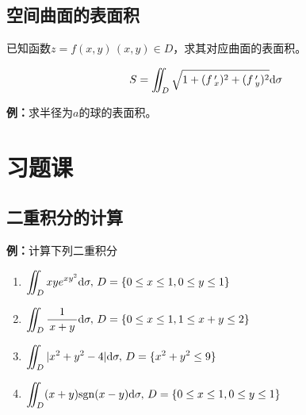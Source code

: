 \begin{center}
\end{center}

\subsection{空间曲面的表面积}

已知函数$z=f(x,y)\,(x,y)\in D$，求其对应曲面的表面积。

$${S=\iint_D\sqrt{1+(f\,'_x)^2+(f\,'_y)^2}\mathrm{d}\sigma}$$

{\bf 例：}求半径为$a$的球的表面积。

\section{习题课}

\subsection{二重积分的计算}

{\bf 例：}计算下列二重积分
\begin{enumerate}[(1)]
  \setlength{\itemindent}{1cm}
  \item $\displaystyle\iint_Dxye^{xy^2}\mathrm{d}\sigma,\,D=\{0\leq x\leq 1,0\leq
  y\leq 1\}$ 
  \item $\displaystyle\iint_D\displaystyle\frac{\,{1}\,}{\,{x+y}\,}\mathrm{d}\sigma,\,D=\{0\leq x\leq 1,1\leq x+y\leq
  2\}$ 
  \item $\displaystyle\iint_D|x^2+y^2-4|\mathrm{d}\sigma,\,D=\{x^2+y^2\leq 9\}$ 
  \item $\displaystyle\iint_D(x+y)\mathrm{sgn}(x-y)\mathrm{d}\sigma,\,D=\{0\leq x\leq 1,0\leq
  y\leq 1\}$
\end{enumerate}

